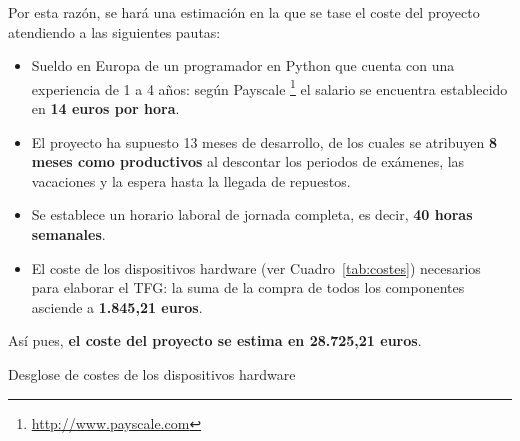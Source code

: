 Por esta razón, se hará una estimación en la que se tase el coste del proyecto atendiendo a las siguientes pautas:

\begin{itemize}
\item Sueldo en Europa de un programador en Python que cuenta con una experiencia de 1 a 4 años: según Payscale \footnote{\url{http://www.payscale.com}} el salario se encuentra establecido en \textbf{14 euros por hora}.
\item El proyecto ha supuesto 13 meses de desarrollo, de los cuales se atribuyen \textbf{8 meses como productivos} al descontar los periodos de exámenes, las vacaciones y la espera hasta la llegada de repuestos.
\item Se establece un horario laboral de jornada completa, es decir, \textbf{40 horas semanales}.
\item El coste de los dispositivos hardware (ver Cuadro~\ref{tab:costes}) necesarios para elaborar el \acs{TFG}: la suma de la compra de todos los componentes asciende a \textbf{1.845,21 euros}.
\end{itemize}

Así pues, \textbf{el coste del proyecto se estima en 28.725,21 euros}.

\begin{table}[!h]
 \centering
 {\small
 
 }
 \caption[Desglose de costes de los dispositivos hardware]
 {Desglose de costes de los dispositivos hardware}
 \label{tab:costes}
\end{table}


